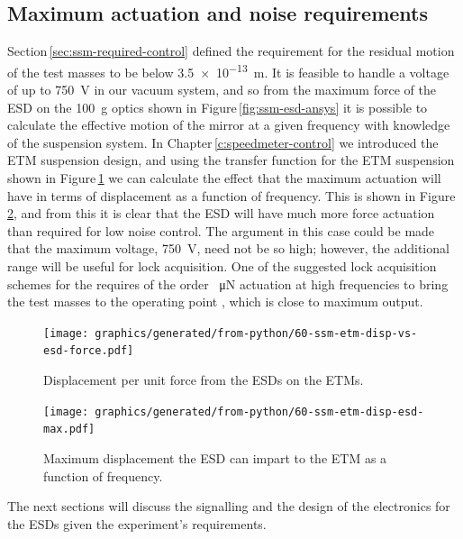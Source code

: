 \subsection{Maximum actuation and noise requirements}
Section\,\ref{sec:ssm-required-control} defined the requirement for the residual motion of the test masses to be below \SI{3.5e-13}{\meter}. It is feasible to handle a voltage of up to \SI{750}{\volt} in our vacuum system, and so from the maximum force of the \gls{ESD} on the \SI{100}{\gram} optics shown in Figure\,\ref{fig:ssm-esd-ansys} it is possible to calculate the effective motion of the mirror at a given frequency with knowledge of the suspension system. In Chapter\,\ref{c:speedmeter-control} we introduced the \gls{ETM} suspension design, and using the transfer function for the \gls{ETM} suspension shown in Figure\,\ref{fig:ssm-etm-disp-vs-esd-force} we can calculate the effect that the maximum actuation will have in terms of displacement as a function of frequency. This is shown in Figure\,\ref{fig:ssm-etm-disp-esd-max}, and from this it is clear that the \gls{ESD} will have much more force actuation than required for low noise control. The argument in this case could be made that the maximum voltage, \SI{750}{\volt}, need not be so high; however, the additional range will be useful for lock acquisition. One of the suggested lock acquisition schemes for the \SSMEXPT{} requires of the order \SI{}{\micro\newton} actuation at high frequencies to bring the test masses to the operating point \cite{Glaefke2015}, which is close to maximum output.

\begin{figure}
  \centering
  \texttt{[image: graphics/generated/from-python/60-ssm-etm-disp-vs-esd-force.pdf]}
  \caption[Displacement per unit force from the electrostatic drives on the end test masses]{\label{fig:ssm-etm-disp-vs-esd-force}Displacement per unit force from the \glspl{ESD} on the \glspl{ETM}.}
\end{figure}

\begin{figure}
  \centering
  \texttt{[image: graphics/generated/from-python/60-ssm-etm-disp-esd-max.pdf]}
  \caption[Maximum displacement the electrostatic drive can impart to the end test mass]{\label{fig:ssm-etm-disp-esd-max}Maximum displacement the \gls{ESD} can impart to the \gls{ETM} as a function of frequency.}
\end{figure}

The next sections will discuss the signalling and the design of the electronics for the \glspl{ESD} given the experiment's requirements.

